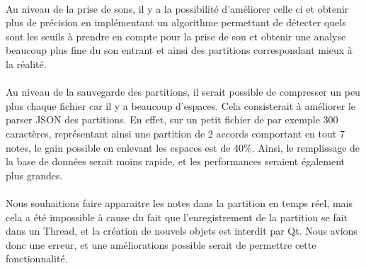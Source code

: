 \paragraph{}
Au niveau de la prise de sons, il y a la possibilité d'améliorer celle ci et obtenir plus de précision 
en implémentant un algorithme permettant de détecter quels sont les seuils à prendre en compte pour la prise de son 
et obtenir une analyse beaucoup plus fine du son entrant et ainsi des partitions correspondant mieux à la 
réalité. 
\paragraph{}
Au niveau de la sauvegarde des partitions, il serait possible de compresser un peu plus chaque fichier 
car il y a beaucoup d'espaces. Cela consisterait à améliorer le parser JSON des partitions. En effet, sur un petit fichier 
de par exemple 300 caractères, représentant ainsi une partition de 2 accords comportant en tout 7 notes, le gain 
possible en enlevant les espaces est de 40\%. Ainsi, le remplissage de la base de données serait moins rapide, 
et les performances seraient également plus grandes.
\paragraph{}
Nous souhaitions faire apparaitre les notes dans la partition en temps réel, mais cela a été impossible à cause 
du fait que l'enregistrement de la partition se fait dans un Thread, et la création de nouvels objets est 
interdit par Qt. Nous avions donc une erreur, et une améliorations possible serait de permettre cette fonctionnalité.